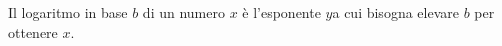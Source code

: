 \documentclass[preview]{standalone}
\begin{document}
\begin{center}
Il logaritmo in base $b$ di un numero $x$ è l'esponente $y$a cui bisogna elevare $b$ per ottenere $x$.
\end{center}
\end{document}
